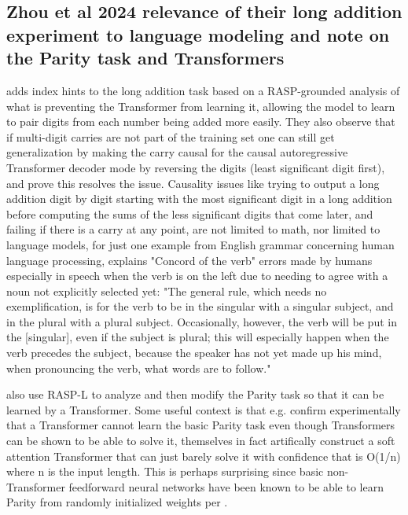 \documentclass[11pt]{article}
\begin{document}
\subsection{Zhou et al 2024 relevance of their long addition experiment to language modeling and note on the Parity task and Transformers}
\label{appendix_long_addition_and_parity}
\cite{Zhou2024} adds index hints to the long addition task based on a RASP-grounded analysis of what is preventing the Transformer from learning it, allowing the model to learn to pair digits from each number being added more easily. They also observe that if multi-digit carries are not part of the training set one can still get generalization by making the carry causal for the causal autoregressive Transformer decoder mode by reversing the digits (least significant digit first), and prove this resolves the issue. Causality issues like trying to output a long addition digit by digit starting with the most significant digit in a long addition before computing the sums of the less significant digits that come later, and failing if there is a carry at any point, are not limited to math, nor limited to language models, for just one example from English grammar concerning human language processing, \cite{jespersen1913modernenglishgrammar1954reprint} explains "Concord of the verb" errors made by humans especially in speech when the verb is on the left due to needing to agree with a noun not explicitly selected yet: "The general rule, which needs no exemplification, is for the verb to be in the singular with a singular subject, and in the plural with a plural subject. Occasionally, however, the verb will be put in the [singular], even if the subject is plural; this will especially happen when the verb precedes the subject, because the speaker has not yet made up his mind, when pronouncing the verb, what words are to follow."

\cite{Zhou2024} also use RASP-L to analyze and then modify the Parity task so that it can be learned by a Transformer.
Some useful context is that e.g. \cite{Chiang2022} confirm experimentally that a Transformer cannot learn the basic Parity task even though Transformers can be shown to be able to solve it, \cite{Chiang2022} themselves in fact artifically construct a soft attention Transformer that can just barely solve it with confidence that is O(1/n) where n is the input length. 
This is perhaps surprising since basic non-Transformer feedforward neural networks have been known to be able to learn Parity from randomly initialized weights per \cite{10.7551/mitpress/4943.003.0128}.
\end{document}
